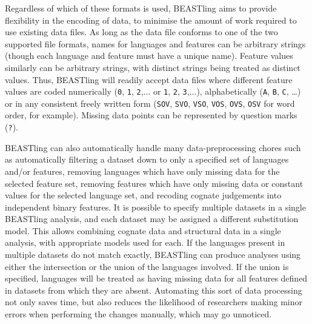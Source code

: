 \documentclass[twocolumn,10pt]{scrartcl}
\begin{document}
Regardless of which of these formats is used, BEASTling aims to provide flexibility in the encoding of data, to minimise the amount of work required to use existing data files.  As long as the data file conforms to one of the two supported file formats, names for languages and features can be arbitrary strings (though each language and feature must have a unique name).  Feature values similarly can be arbitrary strings, with distinct strings being treated as distinct values.  Thus, BEASTling will readily accept data files where different feature values are coded numerically (\texttt{0}, \texttt{1}, \texttt{2},$\ldots$ or \texttt{1}, \texttt{2}, \texttt{3},$\ldots$), alphabetically (\texttt{A}, \texttt{B}, \texttt{C}, \ldots) or in any consistent freely written form (\texttt{SOV}, \texttt{SVO}, \texttt{VSO}, \texttt{VOS}, \texttt{OVS}, \texttt{OSV} for word order, for example).  Missing data points can be represented by question marks (\texttt{?}).

BEASTling can also automatically handle many data-preprocessing chores such as automatically filtering a dataset down to only a specified set of languages and/or features, removing languages which have only missing data for the selected feature set, removing features which have only missing data or constant values for the selected language set, and recoding cognate judgements into independent binary features.  It is possible to specify multiple datasets in a single BEASTling analysis, and each dataset may be assigned a different substitution model.  This allows combining cognate data and structural data in a single analysis, with appropriate models used for each.  If the languages present in multiple datasets do not match exactly, BEASTling can produce analyses using either the intersection or the union of the languages involved.  If the union is specified, languages will be treated as having missing data for all features defined in datasets from which they are absent.  Automating this sort of data processing not only saves time, but also reduces the likelihood of researchers making minor errors when performing the changes manually, which may go unnoticed.
\end{document}
